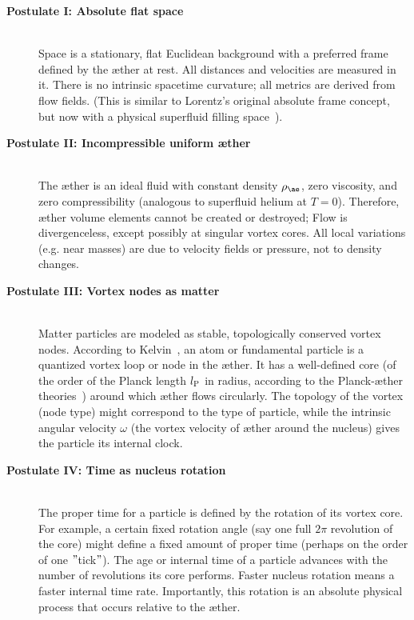 \begin{description}
    \item[\textbf{Postulate I: Absolute flat space}] \hfill \\
    Space is a stationary, flat Euclidean background with a preferred frame defined by the æther at rest. All distances and velocities are measured in it. There is no intrinsic spacetime curvature; all metrics are derived from flow fields. (This is similar to Lorentz's original absolute frame concept, but now with a physical superfluid filling space~\cite{Winterberg2002-PlanckAether}).

    \item[\textbf{Postulate II: Incompressible uniform æther}] \hfill \\
    The æther is an ideal fluid with constant density $\rho_{\ae}$, zero viscosity, and zero compressibility (analogous to superfluid helium at $T=0$). Therefore, æther volume elements cannot be created or destroyed; Flow is divergenceless, except possibly at singular vortex cores. All local variations (e.g. near masses) are due to velocity fields or pressure, not to density changes.

    \item[\textbf{Postulate III: Vortex nodes as matter}] \hfill \\
    Matter particles are modeled as stable, topologically conserved vortex nodes. According to Kelvin~\cite{Kelvin1867-vortex}, an atom or fundamental particle is a quantized vortex loop or node in the æther. It has a well-defined core (of the order of the Planck length $l_{\textrm P}$ in radius, according to the Planck-æther theories~\cite{Winterberg2002-PlanckAether}) around which æther flows circularly. The topology of the vortex (node ​​type) might correspond to the type of particle, while the intrinsic angular velocity $\omega$ (the vortex velocity of æther around the nucleus) gives the particle its internal clock.

    \item[\textbf{Postulate IV: Time as nucleus rotation}] \hfill \\
    The proper time for a particle is defined by the rotation of its vortex core. For example, a certain fixed rotation angle (say one full $2\pi$ revolution of the core) might define a fixed amount of proper time (perhaps on the order of one \("\)tick\("\)). The age or internal time of a particle advances with the number of revolutions its core performs. Faster nucleus rotation means a faster internal time rate. Importantly, this rotation is an absolute physical process that occurs relative to the æther.


\end{description}
